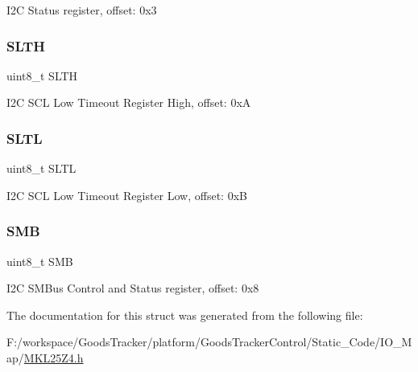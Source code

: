 I2C Status register, offset\+: 0x3 \mbox{\label{struct_i2_c___mem_map_a09cb4115b7ad209d1f47362b420861d7}} 
\subsubsection{\texorpdfstring{S\+L\+TH}{SLTH}}
{\footnotesize\ttfamily uint8\+\_\+t S\+L\+TH}

I2C S\+CL Low Timeout Register High, offset\+: 0xA \mbox{\label{struct_i2_c___mem_map_afde3b60c25d0b8c0534a047e42c661f8}} 
\subsubsection{\texorpdfstring{S\+L\+TL}{SLTL}}
{\footnotesize\ttfamily uint8\+\_\+t S\+L\+TL}

I2C S\+CL Low Timeout Register Low, offset\+: 0xB \mbox{\label{struct_i2_c___mem_map_a68e3b8db845208e127d029a687f96707}} 
\subsubsection{\texorpdfstring{S\+MB}{SMB}}
{\footnotesize\ttfamily uint8\+\_\+t S\+MB}

I2C S\+M\+Bus Control and Status register, offset\+: 0x8 

The documentation for this struct was generated from the following file\+:\begin{DoxyCompactItemize}
\item 
F\+:/workspace/\+Goods\+Tracker/platform/\+Goods\+Tracker\+Control/\+Static\+\_\+\+Code/\+I\+O\+\_\+\+Map/\hyperlink{_m_k_l25_z4_8h}{M\+K\+L25\+Z4.\+h}\end{DoxyCompactItemize}
